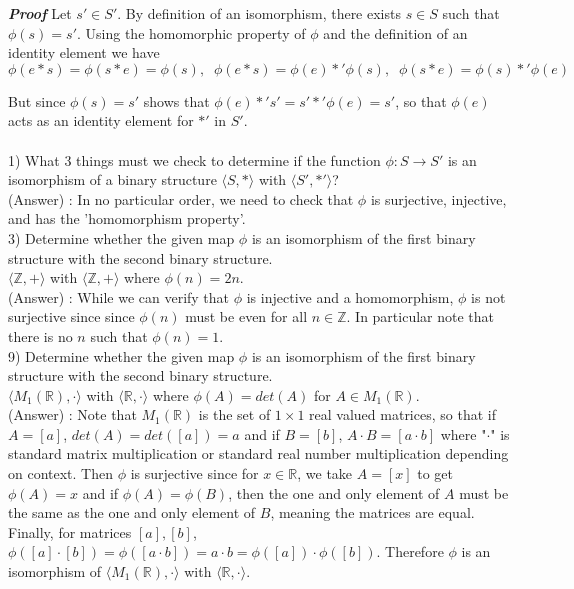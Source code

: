 \documentclass[12pt, letterpaper]{article}
\begin{document}
\noindent \textit{\bf Proof} Let $s' \in S'$. By definition of an isomorphism, there exists $s \in S$ such that $\phi(s) = s'$. Using the homomorphic property of $\phi$ and the definition of an identity element we have $$\phi(e*s) = \phi(s*e) = \phi(s), \;\; \phi(e*s) = \phi(e)*'\phi(s), \;\; \phi(s*e) = \phi(s)*'\phi(e)$$

But since $\phi(s) = s'$ shows that $\phi(e)*'s' = s'*'\phi(e) = s'$, so that $\phi(e)$ acts as an identity element for $*'$ in $S'$.\\

 \\

1) What 3 things must we check to determine if the function $\phi : S \rightarrow S'$ is an isomorphism of a binary structure $\langle S, * \rangle$ with $\langle S', *' \rangle$?\\

(Answer) : In no particular order, we need to check that $\phi$ is surjective, injective, and has the 'homomorphism property'. \\

3) Determine whether the given map $\phi$ is an isomorphism of the first binary structure with the second binary structure. \\

$\langle \mathbb{Z}, + \rangle$ with $\langle \mathbb{Z}, + \rangle$ where $\phi(n) = 2n$. \\

(Answer) : While we can verify that $\phi$ is injective and a homomorphism, $\phi$ is not surjective since since $\phi(n)$ must be even for all $n \in \mathbb{Z}$. In particular note that there is no $n$ such that $\phi(n) = 1$.\\

9) Determine whether the given map $\phi$ is an isomorphism of the first binary structure with the second binary structure. \\

$\langle M_1(\mathbb{R}), \cdot \rangle$ with $\langle \mathbb{R}, \cdot \rangle$ where $\phi(A) = det(A)$ for $A \in M_1(\mathbb{R})$. \\

(Answer) : Note that $M_1(\mathbb{R})$ is the set of $1\times1$ real valued matrices, so that if $A = [a]$, $det(A) = det([a]) = a$ and if $B = [b]$, $A \cdot B = [a \cdot b]$ where "$\cdot$" is standard matrix multiplication or standard real number multiplication depending on context. Then $\phi$ is surjective since for $x \in \mathbb{R}$, we take $A = [x]$ to get $\phi(A) = x$ and if $\phi(A) = \phi(B)$, then the one and only element of $A$ must be the same as the one and only element of $B$, meaning the matrices are equal. Finally, for matrices $[a],[b]$, $\phi([a]\cdot [b]) = \phi([a\cdot b]) = a\cdot b = \phi([a]) \cdot \phi([b])$. Therefore $\phi$ is an isomorphism of $\langle M_1(\mathbb{R}), \cdot \rangle$ with $\langle \mathbb{R}, \cdot \rangle$.\\
\end{document}
